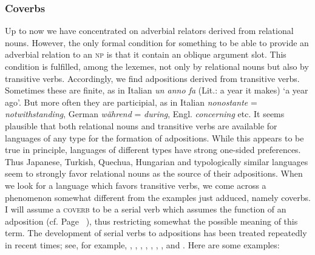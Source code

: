 \subsubsection{Coverbs}\label{sec:3.4.1.7}
Up to now we have concentrated on adverbial relators derived from relational nouns. However, the only formal condition for something to be able to provide an adverbial relation to an \textsc{np} is that it contain an oblique argument slot. This condition is fulfilled, among the lexemes, not only by relational nouns but also by transitive verbs. Accordingly, we find adpositions derived from transitive verbs. Sometimes these are finite, as in Italian \textit{un anno fa} (Lit.: a year it makes) ‘a year ago’. But more often they are participial, as in Italian \textit{nonostante} = \textit{notwithstanding}, German \textit{während} = \textit{during}, Engl. \textit{concerning} etc. It seems plausible that both relational nouns and transitive verbs are available for languages of any type for the formation of adpositions. While this appears to be true in principle, languages of different types have strong one-sided preferences. Thus Japanese, Turkish, Quechua, Hungarian and typologically similar languages seem to strongly favor relational nouns as the source of their adpositions. When we look for a language which favors transitive verbs, we come across a phenomenon somewhat different from the examples just adduced, namely coverbs. I will assume a \textsc{coverb} to be a serial verb which assumes the function of an adposition (cf. Page~\pageref{page37}\chk%
), thus restricting somewhat the possible meaning of this term. The development of serial verbs to adpositions has been treated repeatedly in recent times; see, for example, \citealt{LiEtAL1974}, \citealt{Hagège1975}, \citealt[esp. p.~93ff]{Givón1975}, \citealt{Hyman1975}, \citealt[33--40]{Kahr1975}, \citealt[113--117]{Sasse1977a}, \citealt{Huang1978}, \citealt{Clark1979} and \citealt[213--228]{Lightfoot1979}. Here are some examples:

